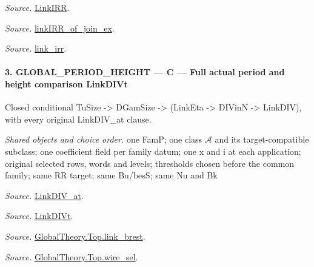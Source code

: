 \emph{Source.} \href{https://github.com/CocoSgt/riemann-hypothesis-lean/blob/7cbf7a0c32fca1badf05931879a37c3f8a2b03b4/src/Formalism/SharpRestriction/GlobalTheoremInputs.lean#L55-L58}{LinkIRR}.

\emph{Source.} \href{https://github.com/CocoSgt/riemann-hypothesis-lean/blob/7cbf7a0c32fca1badf05931879a37c3f8a2b03b4/src/Development/AbelianVarietyTheory/Proofs/GlobalInterpolation/LinkIRROfJoinEx.lean#L17-L38}{linkIRR\_\allowbreak of\_\allowbreak join\_\allowbreak ex}.

\emph{Source.} \href{https://github.com/CocoSgt/riemann-hypothesis-lean/blob/7cbf7a0c32fca1badf05931879a37c3f8a2b03b4/src/Development/AbelianVarietyTheory/Proofs/GlobalInterpolation/LinkIRROfJoinEx.lean#L143-L166}{link\_\allowbreak irr}.



\paragraph{3. GLOBAL\_\allowbreak PERIOD\_\allowbreak HEIGHT — C — Full actual period and height comparison LinkDIVt}

Closed conditional TuSize -> DGamSize -> (LinkEta -> DIVinN -> LinkDIV), with every original LinkDIV\_\allowbreak at clause.

\emph{Shared objects and choice order.} one FamP; one class $\mathcal A$ and its target-compatible subclass; one coefficient field per family datum; one x and i at each application; original selected rows, words and levels; thresholds chosen before the common family; same RR target; same Bu/besS; same Nu and Bk

\emph{Source.} \href{https://github.com/CocoSgt/riemann-hypothesis-lean/blob/7cbf7a0c32fca1badf05931879a37c3f8a2b03b4/src/Formalism/SharpRestriction/GlobalTheoremInputs.lean#L77-L90}{LinkDIV\_\allowbreak at}.

\emph{Source.} \href{https://github.com/CocoSgt/riemann-hypothesis-lean/blob/7cbf7a0c32fca1badf05931879a37c3f8a2b03b4/src/Formalism/SharpRestriction/GlobalTheoremInputs.lean#L94-L96}{LinkDIVt}.

\emph{Source.} \href{https://github.com/CocoSgt/riemann-hypothesis-lean/blob/7cbf7a0c32fca1badf05931879a37c3f8a2b03b4/src/Development/AbelianVarietyTheory/Proofs/GlobalInterpolation/LinkBrest.lean#L7-L25}{GlobalTheory.Top.link\_\allowbreak brest}.

\emph{Source.} \href{https://github.com/CocoSgt/riemann-hypothesis-lean/blob/7cbf7a0c32fca1badf05931879a37c3f8a2b03b4/src/Development/AbelianVarietyTheory/Proofs/GlobalInterpolation/WireSel.lean#L11-L41}{GlobalTheory.Top.wire\_\allowbreak sel}.



